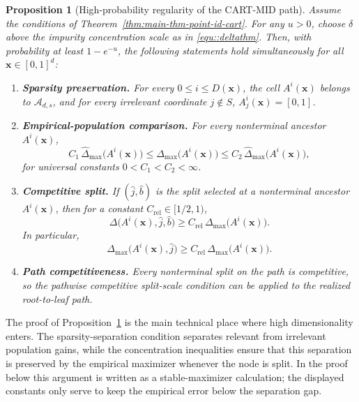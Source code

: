 \documentclass[11pt]{article}
\theoremstyle{plain}
\newtheorem{proposition}[theorem]{Proposition}
\theoremstyle{definition}
\theoremstyle{remark}
\theoremstyle{plain}
\newcommand{\bx}{\mathbf{x}}
\newcommand{\1}{\mathbbm{1}}
\begin{document}
\begin{proposition}[High-probability regularity of the CART-MID path]\label{pro::regularity}
Assume the conditions of Theorem~\ref{thm:main-thm-point-id-cart}. For any $u>0$, choose $\delta$ above the impurity concentration scale as in \eqref{equ::deltathm}. Then, with probability at least $1-e^{-u}$, the following statements hold simultaneously for all $\bx\in[0,1]^d$:
\begin{enumerate}
\item \textbf{Sparsity preservation.} For every $0\le i\le D(\bx)$, the cell $A^i(\bx)$ belongs to $\mathcal{A}_{d,s}$, and for every irrelevant coordinate $j\notin S$, $A_j^i(\bx)=[0,1]$.

\item \textbf{Empirical-population comparison.} For every nonterminal ancestor $A^i(\bx)$,
\[
C_1\,\widehat{\Delta}_{\max}\!\bigl(A^i(\bx)\bigr)
\le
\Delta_{\max}\!\bigl(A^i(\bx)\bigr)
\le
C_2\,\widehat{\Delta}_{\max}\!\bigl(A^i(\bx)\bigr),
\]
for universal constants $0<C_1<C_2<\infty$.

\item \textbf{Competitive split.} If $(\hat j,\hat b)$ is the split selected at a nonterminal ancestor $A^i(\bx)$, then for a constant $C_{\mathrm{rel}}\in[1/2,1)$,
\[
\Delta\bigl(A^i(\bx),\hat j,\hat b\bigr)
\ge
C_{\mathrm{rel}}\,\Delta_{\max}\bigl(A^i(\bx)\bigr).
\]
In particular,
\[
\Delta_{\max}\bigl(A^i(\bx),\hat j\bigr)
\ge
C_{\mathrm{rel}}\,\Delta_{\max}\bigl(A^i(\bx)\bigr).
\]

\item \textbf{Path competitiveness.} Every nonterminal split on the path is competitive, so the pathwise competitive split-scale condition can be applied to the realized root-to-leaf path.
\end{enumerate}
\end{proposition}

The proof of Proposition~\ref{pro::regularity} is the main technical place where high dimensionality enters. The sparsity-separation condition separates relevant from irrelevant population gains, while the concentration inequalities ensure that this separation is preserved by the empirical maximizer whenever the node is split. In the proof below this argument is written as a stable-maximizer calculation; the displayed constants only serve to keep the empirical error below the separation gap.
\end{document}
